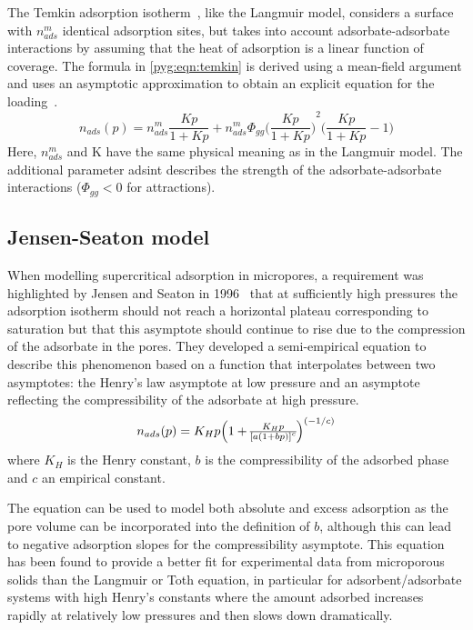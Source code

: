The Temkin adsorption
isotherm~\cite{temkinKineticsAmmoniaSynthesis1940},
like the Langmuir model, considers
a surface with \(n_{ads}^m\) identical adsorption sites, but takes into
account adsorbate-adsorbate interactions by assuming that the
heat of adsorption is a linear function of  coverage.
The formula in \autoref{pyg:eqn:temkin} is derived
using a mean-field argument and uses an asymptotic approximation
to obtain an explicit equation for the
loading~\cite{simonOptimizingNanoporousMaterials2014}.
%
\begin{equation}\label{pyg:eqn:temkin}
	n_{ads}(p) = n_{ads}^m \frac{Kp}{1+Kp} + n_{ads}^m \Phi_{gg}
	{\Big(\frac{Kp}{1+Kp}\Big)}^2 \Big(\frac{Kp}{1+Kp} -1\Big)
\end{equation}
%
Here, \(n_{ads}^m\) and K have the same physical meaning as in the
Langmuir model.
The additional parameter \gls{adsint} describes the strength of the
adsorbate-adsorbate
interactions (\(\Phi_{gg} < 0\) for attractions).

\subsection{Jensen-Seaton model}\label{pyg:models:jseaton}

When modelling supercritical adsorption in micropores, a requirement was
highlighted by
Jensen and Seaton in 1996~\cite{jensenIsothermEquationAdsorption1996}
that at sufficiently high pressures the adsorption
isotherm should not reach a horizontal plateau corresponding to
saturation but that this asymptote should continue to rise due to
the compression of the adsorbate in the pores. They developed a
semi-empirical equation to describe this phenomenon based on a function
that interpolates between two asymptotes: the Henry’s law asymptote at
low pressure and an asymptote reflecting the compressibility of
the adsorbate at high pressure.
%
\begin{equation}\label{pyg:eqn:jseaton}
	n_{ads}(p) = K_H p \Big{(1 + \frac{K_H p}{{[a {(1 + b
									p)}]}^c}\Big)}^{(-1/c)}
\end{equation}
%
where \(K_H\) is the Henry constant, \(b\) is the compressibility of
the adsorbed phase and \(c\) an empirical constant.

The equation can be used to model both absolute and excess adsorption
as the pore volume can be incorporated into the definition of \(b\),
although this can lead to negative adsorption slopes for the
compressibility asymptote. This equation has been found to provide a
better fit for experimental data from microporous solids than the
Langmuir or Toth equation, in particular for
adsorbent/adsorbate systems with high Henry’s constants where the
amount adsorbed increases rapidly at relatively low pressures and
then slows down dramatically.

